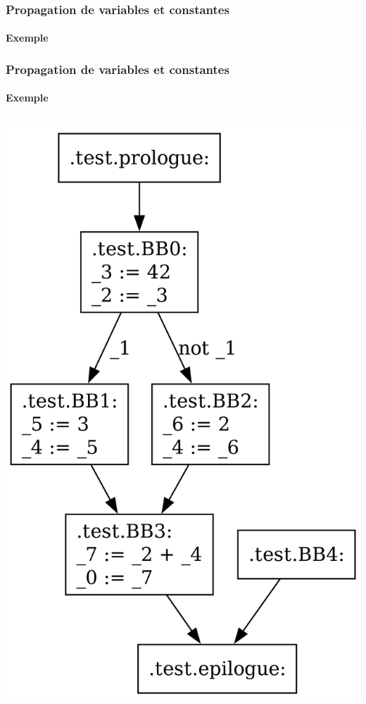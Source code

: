 \documentclass{beamer}
\begin{document}
\begin{frame}
    \frametitle{Propagation de variables et constantes}
    \framesubtitle{Exemple}
    
\end{frame}

\begin{frame}
    \frametitle{Propagation de variables et constantes}
    \framesubtitle{Exemple}
         \begin{columns}
            \begin{column}{.40\textwidth}
                \includegraphics[width=\textwidth,height=0.8\textheight,keepaspectratio]{graphs/ex_propagation.dot.png}
            \end{column}

\end{columns}
\end{frame}
\end{document}
